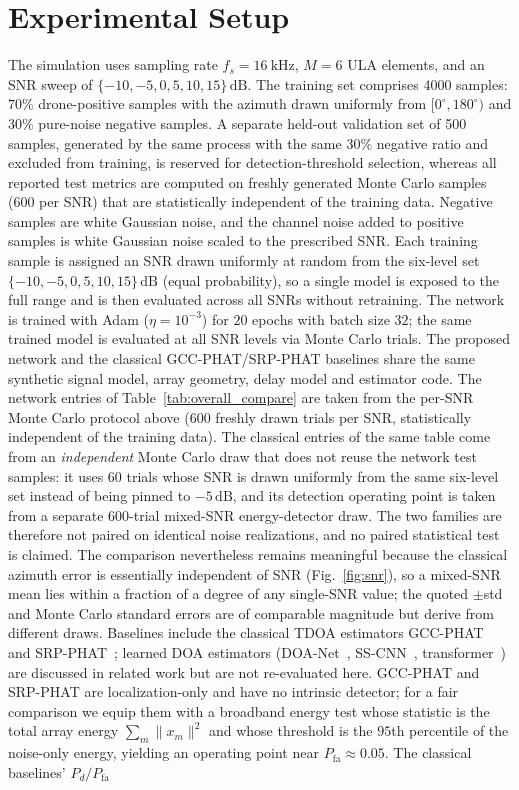 \documentclass[5p,twocolumn]{elsarticle}
\begin{document}
\section{Experimental Setup}
\label{sec:exp}
The simulation uses sampling rate $f_s=\SI{16}{\kilo\hertz}$, $M=6$ ULA elements, and an SNR sweep of $\{-10,-5,0,5,10,15\}\,\mathrm{dB}$. The training set comprises 4000 samples: $70\%$ drone-positive samples with the azimuth drawn uniformly from $[0^\circ,180^\circ)$ and $30\%$ pure-noise negative samples. A separate held-out validation set of 500 samples, generated by the same process with the same $30\%$ negative ratio and excluded from training, is reserved for detection-threshold selection, whereas all reported test metrics are computed on freshly generated Monte Carlo samples (600 per SNR) that are statistically independent of the training data. Negative samples are white Gaussian noise, and the channel noise added to positive samples is white Gaussian noise scaled to the prescribed SNR. Each training sample is assigned an SNR drawn uniformly at random from the six-level set $\{-10,-5,0,5,10,15\}\,\mathrm{dB}$ (equal probability), so a single model is exposed to the full range and is then evaluated across all SNRs without retraining. The network is trained with Adam ($\eta=10^{-3}$) for $20$ epochs with batch size $32$; the same trained model is evaluated at all SNR levels via Monte Carlo trials. The proposed network and the classical GCC-PHAT/SRP-PHAT baselines share the same synthetic signal model, array geometry, delay model and estimator code. The network entries of Table~\ref{tab:overall_compare} are taken from the per-SNR Monte Carlo protocol above (600 freshly drawn trials per SNR, statistically independent of the training data). The classical entries of the same table come from an \emph{independent} Monte Carlo draw that does not reuse the network test samples: it uses 60 trials whose SNR is drawn uniformly from the same six-level set instead of being pinned to $-5\,\mathrm{dB}$, and its detection operating point is taken from a separate 600-trial mixed-SNR energy-detector draw. The two families are therefore not paired on identical noise realizations, and no paired statistical test is claimed. The comparison nevertheless remains meaningful because the classical azimuth error is essentially independent of SNR (Fig.~\ref{fig:snr}), so a mixed-SNR mean lies within a fraction of a degree of any single-SNR value; the quoted $\pm$std and Monte Carlo standard errors are of comparable magnitude but derive from different draws. Baselines include the classical TDOA estimators GCC-PHAT~\cite{knapp1976gcc} and SRP-PHAT~\cite{dibiase2001srp}; learned DOA estimators (DOA-Net~\cite{adavanne2018doa}, SS-CNN~\cite{nguyen2020sscnn}, transformer~\cite{wang2024transformer,mack2022attention}) are discussed in related work but are not re-evaluated here. GCC-PHAT and SRP-PHAT are localization-only and have no intrinsic detector; for a fair comparison we equip them with a broadband energy test whose statistic is the total array energy $\sum_m\|x_m\|^2$ and whose threshold is the $95$th percentile of the noise-only energy, yielding an operating point near $P_{\mathrm{fa}}\approx0.05$. The classical baselines' $P_d/P_{\mathrm{fa}}$ 
\end{document}
